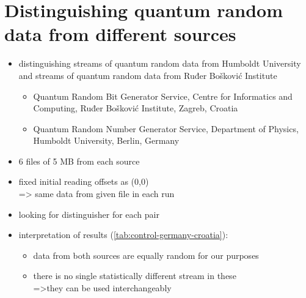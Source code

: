 \documentclass[12pt,oneside]{fithesis2}
\begin{document}
\section{Distinguishing quantum random data from different sources}
\label{sec:control-germany-croatia}

\begin{itemize}
\item distinguishing streams of quantum random data from Humboldt University and streams of quantum random data from Ruđer Bošković Institute
\begin{itemize}
\item Quantum Random Bit Generator Service, Centre for Informatics and Computing, Ruđer Bošković Institute, Zagreb, Croatia
\item Quantum Random Number Generator Service, Department of Physics, Humboldt University, Berlin, Germany
\end{itemize}
\item 6 files of 5 MB from each source
\item fixed initial reading offsets as (0,0) \\ => same data from given file in each run
\item looking for distinguisher for each pair
\item interpretation of results (\autoref{tab:control-germany-croatia}):
\begin{itemize}
\item data from both sources are equally random for our purposes
\item there is no single statistically different stream in these \\=>they can be used interchangeably 
\end{itemize}
\end{itemize}
\end{document}

